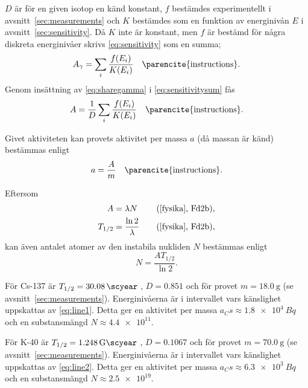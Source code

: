 $D$ är för en given isotop en känd konstant, $f$ bestämdes experimentellt
i avsnitt~\ref{sec:measurements} och $K$ bestämdes som en funktion av
energinivån $E$ i avsnitt~\ref{sec:sensitivity}. Då $K$ inte är konstant, men
$f$ är bestämd för några diskreta energinivåer skrivs \eqref{eq:sensitivity}
som en summa;
%
\begin{equation}
    A_\gamma = \sum_i \frac{f(E_i)}{K(E_i)} \quad \text{\parencite{instructions}} \label{eq:sensitivitysum}.
\end{equation}
%
Genom insättning av \eqref{eq:sharegamma} i \eqref{eq:sensitivitysum} fås
%
\begin{equation}
    A = \frac{1}{D} \sum_i \frac{f(E_i)}{K(E_i)} \quad \text{\parencite{instructions}} \label{eq:activitysum}.
\end{equation}

Givet aktiviteten kan provets aktivitet per massa $a$ (då massan är känd)
bestämmas enligt
%
\begin{equation}
    a = \frac{A}{m} \quad \text{\parencite{instructions}} \label{eq:apm}.
\end{equation}

Eftersom
%
\begin{align}
    A       &= \lambda N             &\quad \text{(\cite{fysika}, Fd2b)} \label{eq:activity}, \\
    T_{1/2} &= \frac{\ln 2}{\lambda} &\quad \text{(\cite{fysika}, Fd2b)} \label{eq:halflife},
\end{align}
%
kan även antalet atomer av den instabila nukliden $N$ bestämmas enligt
%
\begin{equation}
    N = \frac{A T_{1/2}}{\ln 2} \label{eq:substance}.
\end{equation}

För Cs-137 är $T_{1/2} = \qty{30.08}{\scyear}$ ,
$D = \num{0.851}$ \parencite{instructions} och för provet $m = \qty{18.0}{\g}$
(se avsnitt~\ref{sec:measurements}). Energinivåerna är i intervallet vars
känslighet uppskattas av \eqref{eq:line1}. Detta ger en aktivitet per massa
$a_Cs \approx \qty{1.8e4}{Bq}$ och en substansmängd $N \approx \num{4.4e11}$.

För K-40 är $T_{1/2} = \qty{1.248}{\giga\scyear}$ ,
$D = \num{0.1067}$ \parencite{instructions} och för provet $m = \qty{70.0}{\g}$
(se avsnitt~\ref{sec:measurements}). Energinivåerna är i intervallet vars
känslighet uppskattas av \eqref{eq:line2}. Detta ger en aktivitet per massa
$a_Cs \approx \qty{6.3e3}{Bq}$ och en substansmängd $N \approx \num{2.5e19}$.

